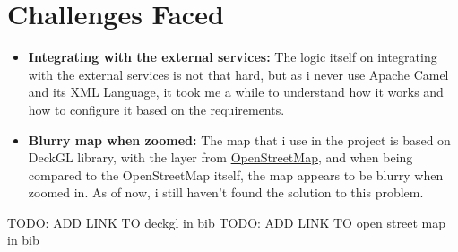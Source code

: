 %
%

\section{Challenges Faced}
\label{sec:learning_challenges:challenges_faced}

\begin{itemize}
    \item \textbf{Integrating with the external services:} The logic itself on integrating with the external services is not that hard, but as i never use Apache Camel and its XML Language, it took me a while to understand how it works and how to configure it based on the requirements.
    \item \textbf{Blurry map when zoomed:} The map that i use in the project is based on DeckGL library, with the layer from \href{https://www.openstreetmap.org/}{OpenStreetMap}, and when being compared to the OpenStreetMap itself, the map appears to be blurry when zoomed in. As of now, i still haven't found the solution to this problem.
\end{itemize}

TODO: ADD LINK TO deckgl in bib
TODO: ADD LINK TO open street map in bib